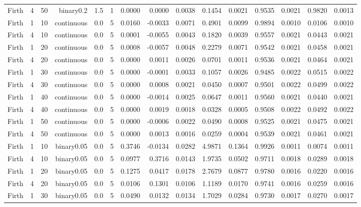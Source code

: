 \begin{longtable}{rrrrrrrrrrrrrrr}
  Firth & 4 & 50 & binary0.2 & 1.5 & 1 & 0.0000 & 0.0000 & 0.0038 & 0.1454 & 0.0021 & 0.9535 & 0.0021 & 0.9820 & 0.0013 \\ 
  Firth & 1 & 10 & continuous & 0.0 & 5 & 0.0160 & -0.0033 & 0.0071 & 0.4901 & 0.0099 & 0.9894 & 0.0010 & 0.0106 & 0.0010 \\ 
  Firth & 4 & 10 & continuous & 0.0 & 5 & 0.0001 & -0.0055 & 0.0043 & 0.1820 & 0.0039 & 0.9557 & 0.0021 & 0.0443 & 0.0021 \\ 
  Firth & 1 & 20 & continuous & 0.0 & 5 & 0.0008 & -0.0057 & 0.0048 & 0.2279 & 0.0071 & 0.9542 & 0.0021 & 0.0458 & 0.0021 \\ 
  Firth & 4 & 20 & continuous & 0.0 & 5 & 0.0000 & 0.0011 & 0.0026 & 0.0701 & 0.0011 & 0.9536 & 0.0021 & 0.0464 & 0.0021 \\ 
  Firth & 1 & 30 & continuous & 0.0 & 5 & 0.0000 & -0.0001 & 0.0033 & 0.1057 & 0.0026 & 0.9485 & 0.0022 & 0.0515 & 0.0022 \\ 
  Firth & 4 & 30 & continuous & 0.0 & 5 & 0.0000 & 0.0008 & 0.0021 & 0.0450 & 0.0007 & 0.9501 & 0.0022 & 0.0499 & 0.0022 \\ 
  Firth & 1 & 40 & continuous & 0.0 & 5 & 0.0000 & -0.0014 & 0.0025 & 0.0647 & 0.0011 & 0.9560 & 0.0021 & 0.0440 & 0.0021 \\ 
  Firth & 4 & 40 & continuous & 0.0 & 5 & 0.0000 & 0.0019 & 0.0018 & 0.0328 & 0.0005 & 0.9508 & 0.0022 & 0.0492 & 0.0022 \\ 
  Firth & 1 & 50 & continuous & 0.0 & 5 & 0.0000 & -0.0006 & 0.0022 & 0.0490 & 0.0008 & 0.9525 & 0.0021 & 0.0475 & 0.0021 \\ 
  Firth & 4 & 50 & continuous & 0.0 & 5 & 0.0000 & 0.0013 & 0.0016 & 0.0259 & 0.0004 & 0.9539 & 0.0021 & 0.0461 & 0.0021 \\ 
  Firth & 1 & 10 & binary0.05 & 0.0 & 5 & 0.3746 & -0.0134 & 0.0282 & 4.9871 & 0.1364 & 0.9926 & 0.0011 & 0.0074 & 0.0011 \\ 
  Firth & 4 & 10 & binary0.05 & 0.0 & 5 & 0.0977 & 0.3716 & 0.0143 & 1.9735 & 0.0502 & 0.9711 & 0.0018 & 0.0289 & 0.0018 \\ 
  Firth & 1 & 20 & binary0.05 & 0.0 & 5 & 0.1275 & 0.0417 & 0.0178 & 2.7679 & 0.0877 & 0.9780 & 0.0016 & 0.0220 & 0.0016 \\ 
  Firth & 4 & 20 & binary0.05 & 0.0 & 5 & 0.0106 & 0.1301 & 0.0106 & 1.1189 & 0.0170 & 0.9741 & 0.0016 & 0.0259 & 0.0016 \\ 
  Firth & 1 & 30 & binary0.05 & 0.0 & 5 & 0.0490 & 0.0132 & 0.0134 & 1.7029 & 0.0284 & 0.9730 & 0.0017 & 0.0270 & 0.0017 \\ 

\end{longtable}
